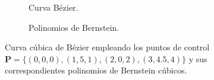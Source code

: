 \documentclass[11pt]{book}
\theoremstyle{plain} %
\theoremstyle{definition} %
\theoremstyle{definition} %
\begin{document}
\begin{figure}[H]
    \centering
    \begin{subfigure}{0.33\textwidth}
        
        \caption{Curva Bézier.}
        \label{fig:bezier_curva_1}
    \end{subfigure}
    \begin{subfigure}{0.33\textwidth}
        
        \caption{Polinomios de Bernstein.}
        \label{fig:bezier_curva_2}
    \end{subfigure}
    \caption{Curva cúbica de Bézier empleando los puntos de control $\mathbf{P} = \{ (0, 0, 0), (1, 5, 1), (2, 0, 2), (3, 4.5, 4) \}$ y sus correspondientes polinomios de Bernstein cúbicos.}
    \label{fig:bezier_curve}   
\end{figure}

\vspace{-0.2cm}



\vspace{-0.1cm}
\end{document}
